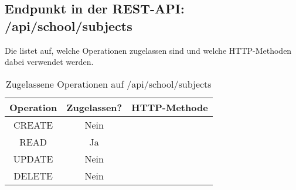 \subsection{Endpunkt in der REST-API: /api/school/subjects}
Die  listet auf, welche Operationen zugelassen sind und welche HTTP-Methoden dabei verwendet werden. 

\begin{table}[!htbp]
	\begin{tabular}{|c|c|c|}
		\hline
			\textbf{Operation} & \textbf{Zugelassen?} & \textbf{HTTP-Methode} \\ \hline
			CREATE & Nein & \\ \hline 
			READ & Ja &  \\ \hline
			UPDATE & Nein & \\ \hline 
			DELETE & Nein & \\ \hline
	\end{tabular}

		\caption{Zugelassene Operationen auf /api/school/subjects}
		\label{tab:end:rest:api:school:subjects:meth}
\end{table}

